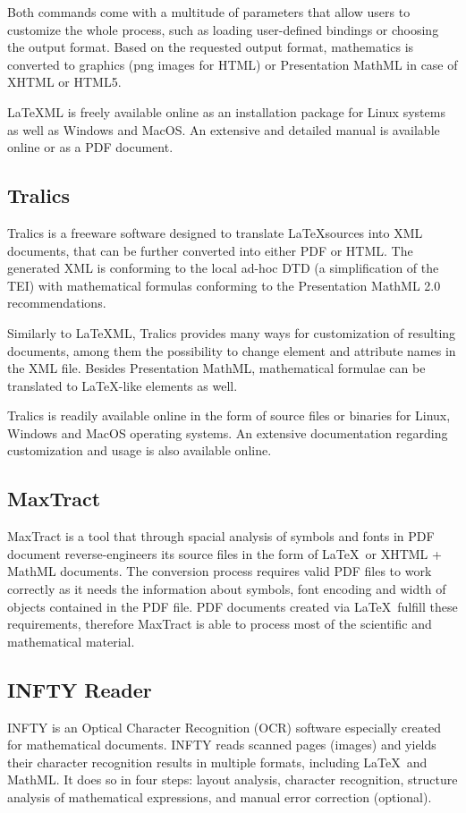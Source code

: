 \documentclass[11pt,oneside,final]{fithesis2}
\begin{document}
Both commands come with a multitude of parameters that allow users to customize the whole process, such as loading user-defined bindings or choosing the output format. Based on the requested output format, mathematics is converted to graphics (png images for HTML) or Presentation MathML in case of XHTML or HTML5. 

\LaTeX ML is freely available online as an installation package for Linux systems as well as Windows and MacOS. An extensive and detailed manual is available online or as a PDF document.

\subsection{Tralics}
Tralics\cite{tralics:grimm2003} is a freeware software designed to translate \LaTeX sources into XML documents, that can be further converted into either PDF or HTML. The generated XML is conforming to the local ad-hoc DTD (a simplification of the TEI) with mathematical formulas conforming to the Presentation MathML 2.0 recommendations.

Similarly to \LaTeX ML, Tralics provides many ways for customization of resulting documents, among them the possibility to change element and attribute names in the XML file. Besides Presentation MathML, mathematical formulae can be translated to \LaTeX -like   elements as well.

Tralics is readily available online in the form of source files or binaries for Linux, Windows and MacOS operating systems. An extensive documentation regarding customization and usage is also available online. 

\subsection{MaxTract}
MaxTract is a tool that through spacial analysis of symbols and fonts in PDF document reverse-engineers its source files in the form of \LaTeX\ or XHTML + MathML documents. The conversion process requires valid PDF files to work correctly as it needs the information about symbols, font encoding and width of objects contained in the PDF file. PDF documents created via \LaTeX\ fulfill these requirements, therefore MaxTract is able to process most of the scientific and mathematical material.


\subsection{INFTY Reader}
INFTY is an Optical Character Recognition (OCR) software especially created for mathematical documents. INFTY reads scanned pages (images) and yields their character recognition results in multiple formats, including \LaTeX\ and MathML. It does so in four steps: layout analysis, character recognition, structure analysis of mathematical expressions, and manual error correction (optional). 
\end{document}
